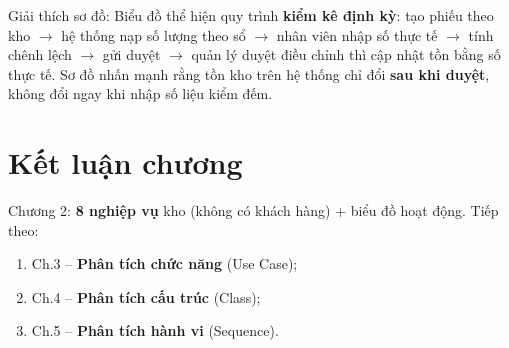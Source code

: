 Giải thích sơ đồ: Biểu đồ thể hiện quy trình \textbf{kiểm kê định kỳ}: tạo phiếu theo kho $\rightarrow$ hệ thống nạp số lượng theo sổ $\rightarrow$ nhân viên nhập số thực tế $\rightarrow$ tính chênh lệch $\rightarrow$ gửi duyệt $\rightarrow$ quản lý duyệt điều chỉnh thì cập nhật tồn bằng số thực tế. Sơ đồ nhấn mạnh rằng tồn kho trên hệ thống chỉ đổi \textbf{sau khi duyệt}, không đổi ngay khi nhập số liệu kiểm đếm.

\section{Kết luận chương}

Chương 2: \textbf{8 nghiệp vụ} kho (không có khách hàng) + biểu đồ hoạt động. Tiếp theo:
\begin{enumerate}[leftmargin=1.5cm]
    \item Ch.3 -- \textbf{Phân tích chức năng} (Use Case);
    \item Ch.4 -- \textbf{Phân tích cấu trúc} (Class);
    \item Ch.5 -- \textbf{Phân tích hành vi} (Sequence).
\end{enumerate}
